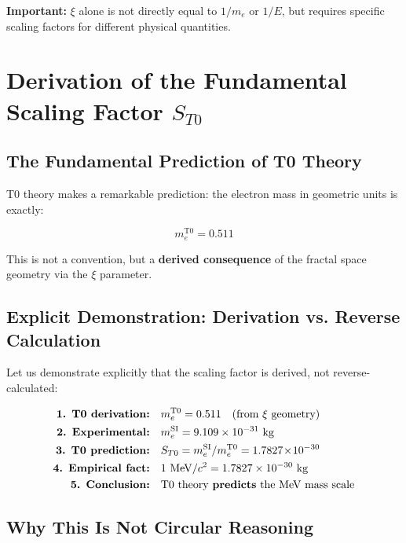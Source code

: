 	\textbf{Important:} $\xi$ alone is not directly equal to $1/m_e$ or $1/E$, but requires specific scaling factors for different physical quantities.
	
	\section{Derivation of the Fundamental Scaling Factor $S_{T0}$}
	\label{sec:scaling-derivation}
	
	\subsection{The Fundamental Prediction of T0 Theory}
	
	T0 theory makes a remarkable prediction: the electron mass in geometric units is exactly:
	
	\begin{equation}
		m_e^{\mathrm{T0}} = 0.511
	\end{equation}
	
	This is not a convention, but a \textbf{derived consequence} of the fractal space geometry via the $\xi$ parameter.
	
	\subsection{Explicit Demonstration: Derivation vs. Reverse Calculation}
	
	Let us demonstrate explicitly that the scaling factor is derived, not reverse-calculated:
	
	\begin{align}
		\textbf{1. T0 derivation:} \quad & m_e^{\mathrm{T0}} = 0.511 \quad \text{(from $\xi$ geometry)} \\
		\textbf{2. Experimental:} \quad & m_e^{\mathrm{SI}} = 9.109 \times 10^{-31}~\mathrm{kg} \\
		\textbf{3. T0 prediction:} \quad & S_{T0} = m_e^{\mathrm{SI}}/m_e^{\mathrm{T0}} = 1.7827\!\times\!10^{-30} \\
		\textbf{4. Empirical fact:} \quad & 1~\mathrm{MeV}/c^2 = 1.7827 \times 10^{-30}~\mathrm{kg} \\
		\textbf{5. Conclusion:} \quad & \text{T0 theory \textbf{predicts} the MeV mass scale}
	\end{align}
	
	\subsection{Why This Is Not Circular Reasoning}
	
